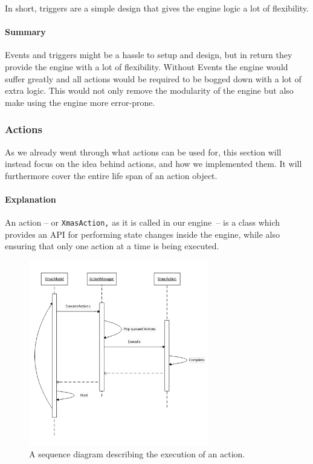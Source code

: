 In short, triggers are a simple design that gives the engine logic
a lot of flexibility. 


\paragraph*{Summary}

Events and triggers might be a hassle to setup and design, but in
return they provide the engine with a lot of flexibility. Without
Events the engine would suffer greatly and all actions would be required
to be bogged down with a lot of extra logic. This would not only remove
the modularity of the engine but also make using the engine more error-prone.


\subsubsection{Actions}

As we already went through what actions can be used for, this section
will instead focus on the idea behind actions, and how we implemented
them. It will furthermore cover the entire life span of an action
object.


\paragraph*{Explanation}

An action -- or \texttt{XmasAction,} as it is called in our engine\texttt{
}-- is a class which provides an API for performing state changes
inside the engine, while also ensuring that only one action at a time
is being executed. 

\begin{figure}
\begin{centering}
\includegraphics[width=0.7\textwidth]{ImplementationActionQueuingExplanation}
\par\end{centering}

\caption{\label{fig:ImplementationActionQueuingExplanation}A sequence diagram
describing the execution of an action.}
\end{figure}



